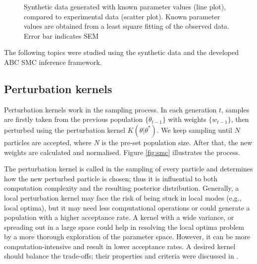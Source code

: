 \begin{figure}[ht]
    \begin{center}
    \end{center}

    \caption[Synthetic data generated with known parameter values]%
    {Synthetic data generated with known parameter values (line plot), compared to experimental data (scatter plot). Known parameter values are obtained from a least square fitting of the observed data. Error bar indicates SEM}
    \label{fig:infer_back_data}

\end{figure}


The following topics were studied using the synthetic data and the developed ABC SMC inference framework.

\subsection{Perturbation kernels}

Perturbation kernels work in the sampling process. In each generation $t$, samples are firstly taken from the previous population $\{\theta_{t-1}\}$ with weights $\{w_{t-1}\}$, then perturbed using the perturbation kernel $K(\theta|\theta^*)$. We keep sampling until $N$ particles are accepted, where $N$ is the pre-set population size. After that, the new weights are calculated and normalised. Figure \ref{fig:smc} illustrates the process.

The perturbation kernel is called in the sampling of every particle and determines how the new perturbed particle is chosen; thus it is influential to both computation complexity and the resulting posterior distribution. Generally, a local perturbation kernel may face the risk of being stuck in local modes (e,g., local optima), but it may need less computational operations or could generate a population with a higher acceptance rate. A kernel with a wide variance, or spreading out in a large space could help in resolving the local optima problem by a more thorough exploration of the parameter space. However, it can be more computation-intensive and result in lower acceptance rates. A desired kernel should balance the trade-offs; their properties and criteria were discussed in \cite{ref:kernel}.

